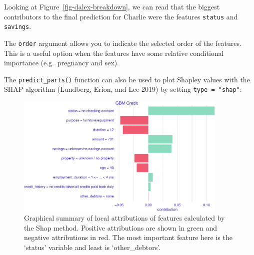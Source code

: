 Looking at Figure~\ref{fig-dalex-breakdown}, we can read that the
biggest contributors to the final prediction for Charlie were the
features \texttt{status} and \texttt{savings}.

\begin{tcolorbox}[enhanced jigsaw, opacitybacktitle=0.6, rightrule=.15mm, opacityback=0, arc=.35mm, breakable, titlerule=0mm, colframe=quarto-callout-tip-color-frame, coltitle=black, bottomrule=.15mm, toprule=.15mm, colback=white, colbacktitle=quarto-callout-tip-color!10!white, bottomtitle=1mm, toptitle=1mm, title=\textcolor{quarto-callout-tip-color}{\faLightbulb}\hspace{0.5em}{Selected Order of Features}, leftrule=.75mm, left=2mm]

The \texttt{order} argument allows you to indicate the selected order of
the features. This is a useful option when the features have some
relative conditional importance (e.g.~pregnancy and sex).

\end{tcolorbox}

The \texttt{predict\_parts()} function can also be used to plot Shapley
values with the SHAP algorithm (Lundberg, Erion, and Lee 2019) by
setting \texttt{type\ =\ "shap"}:

\begin{Shaded}
\begin{Highlighting}[]
\NormalTok{(} \NormalTok{),}
   \NormalTok{)}
\end{Highlighting}
\end{Shaded}

\begin{figure}[H]

{\centering \includegraphics[width=0.9\textwidth,height=\textheight]{chapters/chapter12/model_interpretation_files/figure-pdf/fig-dalex-shaps-1.pdf}

}

\caption{\label{fig-dalex-shaps}Graphical summary of local attributions
of features calculated by the Shap method. Positive attributions are
shown in green and negative attributions in red. The most important
feature here is the `status' variable and least is `other\_debtors'.}

\end{figure}

